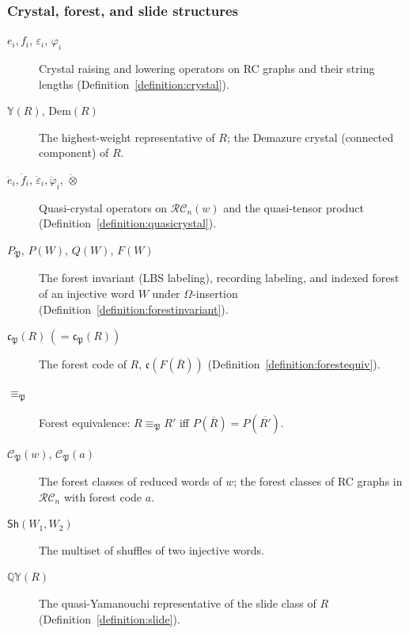 \documentclass{amsart}
\theoremstyle{definition}
\theoremstyle{remark}
\numberwithin{equation}{subsection}
\newcommand{\QY}{\ensuremath{\mathbb{QY}}}
\newcommand{\RC}{\mathcal{RC}}
\newcommand{\code}{\mathfrak{c}}
\newcommand{\forest}{\mathfrak{P}}
\newcommand{\fcode}{\mathfrak{c}_\forest}
\newcommand{\finv}{P_{\forest}}
\begin{document}
\subsubsection*{Crystal, forest, and slide structures}
\begin{description}
\item[$e_i,f_i$, $\varepsilon_i$, $\varphi_i$] Crystal raising and lowering operators on RC graphs and their string lengths (Definition~\ref{definition:crystal}).
\item[$\mathbb{Y}(R)$, $\mathrm{Dem}(R)$] The highest-weight representative of $R$; the Demazure crystal (connected component) of $R$.
\item[$\ddot e_i,\ddot f_i$, $\ddot\varepsilon_i,\ddot\varphi_i$, $\ddot\otimes$] Quasi-crystal operators on $\RC_n(w)$ and the quasi-tensor product (Definition~\ref{definition:quasicrystal}).
\item[$\finv$, $P(W)$, $Q(W)$, $F(W)$] The forest invariant (LBS labeling), recording labeling, and indexed forest of an injective word $W$ under $\Omega$-insertion (Definition~\ref{definition:forestinvariant}).
\item[$\fcode(R)\,(=\code_\forest(R))$] The forest code of $R$, $\code(F(\overline{R}))$ (Definition~\ref{definition:forestequiv}).
\item[$\equiv_\forest$] Forest equivalence: $R\equiv_\forest R'$ iff $P(\overline{R})=P(\overline{R'})$.
\item[$\mathcal{C}_\forest(w)$, $\mathcal{C}_\forest(a)$] The forest classes of reduced words of $w$; the forest classes of RC graphs in $\RC_n$ with forest code $a$.
\item[$\mathsf{Sh}(W_1,W_2)$] The multiset of shuffles of two injective words.
\item[$\QY(R)$] The quasi-Yamanouchi representative of the slide class of $R$ (Definition~\ref{definition:slide}).
\end{description}
\end{document}
